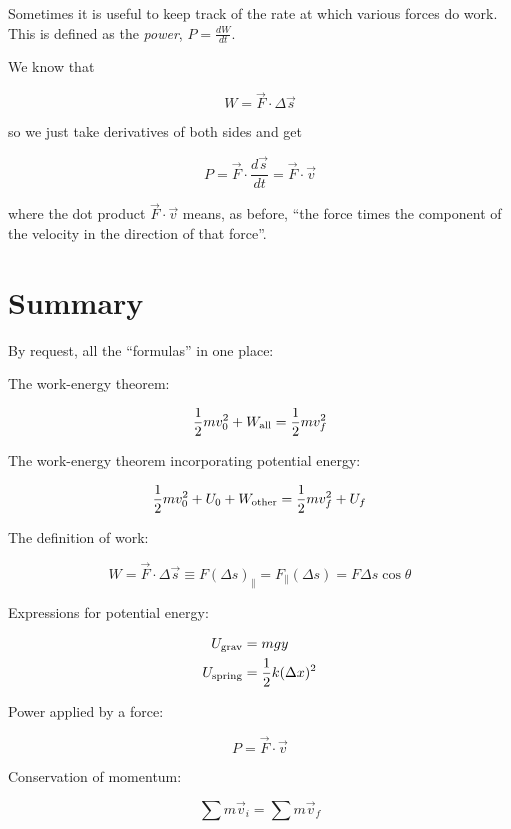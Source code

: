 \documentclass[10pt]{article}
\begin{document}
Sometimes it is useful to keep track of the rate at which various forces do work. This is defined as the {\it power}, $P = \frac{dW}{dt}.$

We know that 

$$W = \vec F \cdot \Delta \vec s$$

so we just take derivatives of both sides and get

$$P = \vec F \cdot \frac{d\vec s}{dt} = \vec F \cdot \vec v$$

where the dot product $\vec F \cdot \vec v$ means, as before, ``the force times the component of the velocity in the direction of that force''.
\newpage
\section{Summary}

By request, all the ``formulas'' in one place:

The work-energy theorem:

\begin{equation}
\frac{1}{2}mv_0^2 + W_{\rm all} = \frac{1}{2}mv_f^2
\end{equation}

The work-energy theorem incorporating potential energy:

\begin{equation}
\frac{1}{2}mv_0^2 + U_0 + W_{\rm other} = \frac{1}{2}mv_f^2 + U_f
\end{equation}

The definition of work:

\begin{equation}
W = \vec F \cdot \Delta \vec s \equiv F (\Delta s)_\parallel = F_\parallel(\Delta s) = F \Delta s \cos \theta
\end{equation}

Expressions for potential energy:

\begin{align}
U_{\rm grav} &= mgy \\
U_{\rm spring} &= \frac{1}{2}k(\Delta x)^2
\end{align}

Power applied by a force:

\begin{equation}
P = \vec F \cdot \vec v
\end{equation}

Conservation of momentum:

\begin{equation}
\sum m \vec v_i = \sum m \vec v_f
\end{equation}
\end{document}
